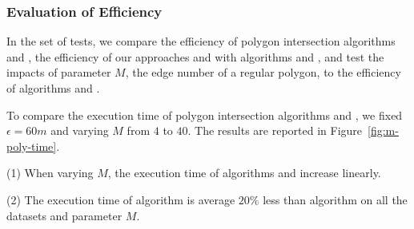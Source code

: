 \subsubsection{Evaluation of Efficiency}


In the set of tests, we compare the efficiency of polygon intersection algorithms \rpia and \cpia, the efficiency of our approaches \cist and \cista with algorithms \dps and \squishe, and test the impacts of parameter $M$, \ie the edge number of a regular polygon, to the efficiency of algorithms \cist and \cista.
%



To compare the execution time of polygon intersection algorithms \rpia and \cpia, we fixed $\epsilon =60m$ and varying $M$ from $4$ to $40$.
%
The results are reported in Figure~\ref{fig:m-poly-time}.


\ni(1) When varying $M$, the execution time of algorithms \rpia and \cpia increase linearly.

\ni(2) The execution time of algorithm \rpia is average \textcolor[rgb]{1.00,0.00,0.00}{$20\%$ }less than algorithm \cpia on all the datasets and parameter $M$.




